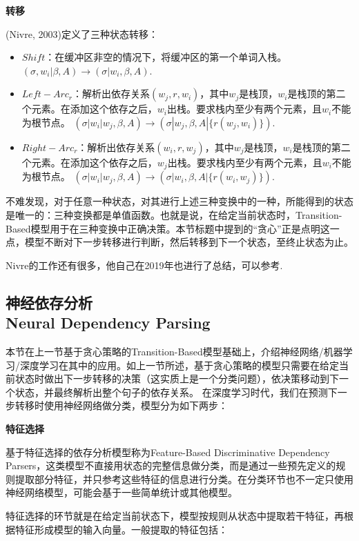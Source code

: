 \textbf{转移}

(Nivre, 2003)定义了三种状态转移：

\begin{itemize}
    \item $Shift$：在缓冲区非空的情况下，将缓冲区的第一个单词入栈。
    $(\sigma, w_i|\beta, A)\to(\sigma|w_i, \beta, A)$.
    \item $Left-Arc_r$：解析出依存关系$(w_j, r, w_i)$，其中$w_j$是栈顶，$w_i$是栈顶的第二个元素。在添加这个依存之后，$w_i$出栈。要求栈内至少有两个元素，且$w_i$不能为根节点。
    $(\sigma|w_i|w_j, \beta, A)\to(\sigma|w_j, \beta, A|\{r(w_j, w_i)\})$.
    \item $Right-Arc_r$：解析出依存关系$(w_i, r, w_j)$，其中$w_j$是栈顶，$w_i$是栈顶的第二个元素。在添加这个依存之后，$w_j$出栈。要求栈内至少有两个元素，且$w_i$不能为根节点。
    $(\sigma|w_i|w_j, \beta, A)\to(\sigma|w_i, \beta, A|\{r(w_i, w_j)\})$.
\end{itemize}

不难发现，对于任意一种状态，对其进行上述三种变换中的一种，所能得到的状态是唯一的：三种变换都是单值函数。也就是说，在给定当前状态时，Transition-Based模型用于在三种变换中正确决策。本节标题中提到的“贪心”正是点明这一点，模型不断对下一步转移进行判断，然后转移到下一个状态，至终止状态为止。

Nivre的工作还有很多，他自己在2019年也进行了总结，可以参考\cite{04-NivrePaper, 04-NivreSlides}.

\subsection{神经依存分析 \\ Neural Dependency Parsing}

本节在上一节基于贪心策略的Transition-Based模型基础上，介绍神经网络/机器学习/深度学习在其中的应用。如上一节所述，基于贪心策略的模型只需要在给定当前状态时做出下一步转移的决策（这实质上是一个分类问题），依决策移动到下一个状态，并最终解析出整个句子的依存关系。
在深度学习时代，我们在预测下一步转移时使用神经网络做分类，模型分为如下两步：

\textbf{特征选择}

基于特征选择的依存分析模型称为Feature-Based Discriminative Dependency Parsers，这类模型不直接用状态的完整信息做分类，而是通过一些预先定义的规则提取部分特征，并只参考这些特征的信息进行分类。在分类环节也不一定只使用神经网络模型，可能会基于一些简单统计或其他模型。

特征选择的环节就是在给定当前状态下，模型按规则从状态中提取若干特征，再根据特征形成模型的输入向量。一般提取的特征包括：


